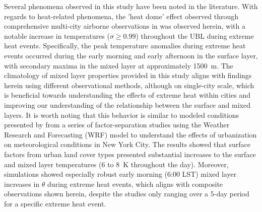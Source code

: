 Several phenomena observed in this study have been noted in the literature. With regards to heat-related phenomena, the 'heat dome' effect observed through comprehensive multi-city airborne observations in \citet{zhang2020} was observed herein, with a notable increase in temperatures ($\sigma \geq 0.99$) throughout the UBL during extreme heat events. Specifically, the peak temperature anomalies during extreme heat events occurred during the early morning and early afternoon in the surface layer, with secondary maxima in the mixed layer at approximately \SI{1500}{\meter}. The climatology of mixed layer properties provided in this study aligns with findings herein using different observational methods, although on single-city scale, which is beneficial towards understanding the effects of extreme heat within cities and improving our understanding of the relationship between the surface and mixed layers. It is worth noting that this behavior is similar to modeled conditions presented by \citet{ortiz2018} from a series of factor-separation studies using the Weather Research and Forecasting (WRF) model to understand the effects of urbanization on meteorological conditions in New York City. The results showed that surface factors from urban land cover types presented substantial increases to the surface and mixed layer temperatures (6 to \SI{8}{\kelvin} throughout the day). Moreover, simulations showed especially robust early morning (6:00 LST) mixed layer increases in $\theta$ during extreme heat events, which aligns with composite observations shown herein, despite the studies only ranging over a 5-day period for a specific extreme heat event.

